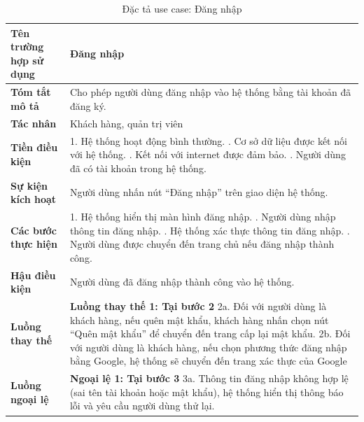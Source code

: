{
\begin{longtable}{|>{\bfseries}p{4cm}|p{11.5cm}|}
\caption{Đặc tả use case: Đăng nhập}
\label{tab:uc-login} \\
\hline
\textbf{Tên trường hợp sử dụng} & Đăng nhập \\
\hline
\textbf{Tóm tắt mô tả} & Cho phép người dùng đăng nhập vào hệ thống bằng tài khoản đã đăng ký. \\
\hline
\textbf{Tác nhân} & Khách hàng, quản trị viên \\
\hline
\textbf{Tiền điều kiện} & 1. Hệ thống hoạt động bình thường. \newline
2. Cơ sở dữ liệu được kết nối với hệ thống. \newline
3. Kết nối với internet được đảm bảo. \newline
4. Người dùng đã có tài khoản trong hệ thống.\\
\hline
\textbf{Sự kiện kích hoạt} & Người dùng nhấn nút “Đăng nhập” trên giao diện hệ thống. \\
\hline
\textbf{Các bước thực hiện} & 1. Hệ thống hiển thị màn hình đăng nhập. \newline
2. Người dùng nhập thông tin đăng nhập. \newline
3. Hệ thống xác thực thông tin đăng nhập. \newline
4. Người dùng được chuyển đến trang chủ nếu đăng nhập thành công. \\
\hline
\textbf{Hậu điều kiện} & Người dùng đã đăng nhập thành công vào hệ thống. \\
\hline
\textbf{Luồng thay thế} & \textbf{Luồng thay thế 1: Tại bước 2} \newline
2a. Đối với người dùng là khách hàng, nếu quên mật khẩu, khách hàng nhấn chọn nút “Quên mật khẩu” để chuyển đến trang cấp lại mật khẩu. \newline
2b. Đối với người dùng là khách hàng, nếu chọn phương thức đăng nhập bằng Google, hệ thống sẽ chuyển đến trang xác thực của Google\\
\hline
\textbf{Luồng ngoại lệ} & \textbf{Ngoại lệ 1: Tại bước 3} \newline
3a. Thông tin đăng nhập không hợp lệ (sai tên tài khoản hoặc mật khẩu), hệ thống hiển thị thông báo lỗi và yêu cầu người dùng thử lại. \\
\hline
\end{longtable}

}

